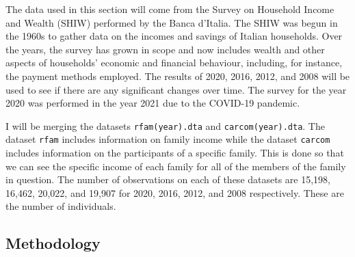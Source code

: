 \documentclass[12pt]{article}
\begin{document}
\begin{spacing}{1.5}

The data used in this section will come from the Survey on Household Income and Wealth (SHIW) performed by the Banca d'Italia.  The SHIW was begun in the 1960s to gather data on the incomes and savings of Italian households. Over the years, the survey has grown in scope and now includes wealth and other aspects of households' economic and financial behaviour, including, for instance, the payment methods employed. The results of 2020, 2016, 2012, and 2008 will be used to see if there are any significant changes over time. The survey for the year 2020 was performed in the year 2021 due to the COVID-19 pandemic. 


I will be merging the datasets \verb+rfam(year).dta+ and \verb+carcom(year).dta+. The dataset \verb+rfam+ includes information on family income while the dataset \verb+carcom+ includes information on the participants of a specific family. This is done so that we can see the specific income of each family for all of the members of the family in question. The number of observations on each of these datasets are 15,198, 16,462, 20,022, and 19,907 for 2020, 2016, 2012, and 2008 respectively. These are the number of individuals.

\end{spacing}

\subsection{Methodology}
\end{document}
